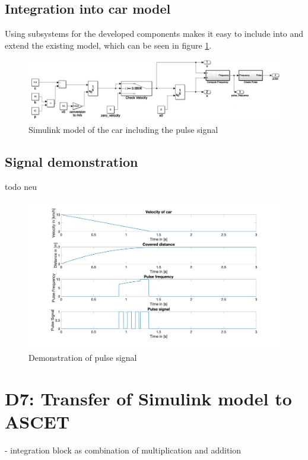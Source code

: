\section{Integration into car model}\label{sec:D6Frequency}
Using subsystems for the developed components makes it easy to include into and extend the existing model, which can be seen in figure \ref{fig:D6_Integation}.
\begin{figure}[H]
\centering
\includegraphics[width=1\textwidth]{images/D6_integration.png}
\caption{Simulink model of the car including the pulse signal}
\label{fig:D6_Integation}
\end{figure}

\section{Signal demonstration}\label{sec:D6_SignalDemonstration}

todo neu
\begin{figure}[H]
\centering
\includegraphics[width=1\textwidth]{images/D6_result.jpg}
\caption{Demonstration of pulse signal}
\label{fig:D6_Result}
\end{figure}

\chapter{D7: Transfer of Simulink model to ASCET}\label{cha:D7}
- integration block as combination of multiplication and addition

